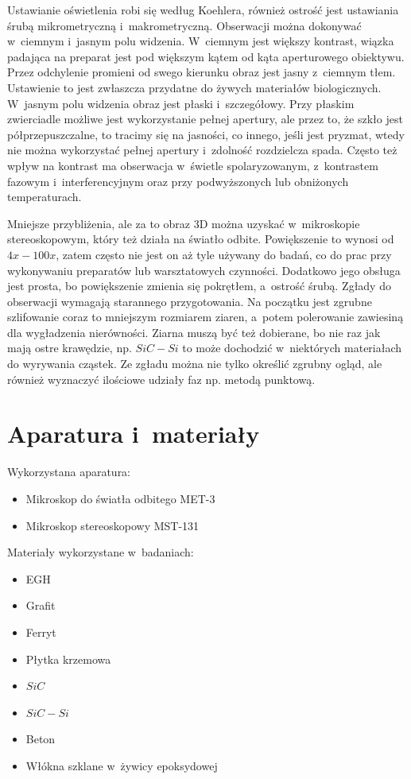 Ustawianie oświetlenia robi się według Koehlera, również ostrość jest ustawiania śrubą mikrometryczną i~makrometryczną. Obserwacji można dokonywać w~ciemnym i~jasnym polu widzenia. W~ciemnym jest większy kontrast, wiązka padająca na preparat jest pod większym kątem od kąta aperturowego obiektywu. Przez odchylenie promieni od swego kierunku obraz jest jasny z~ciemnym tłem. Ustawienie to jest zwłaszcza przydatne do żywych materiałów biologicznych. W~jasnym polu widzenia obraz jest płaski i~szczegółowy. Przy płaskim zwierciadle możliwe jest wykorzystanie pełnej apertury, ale przez to, że szkło jest półprzepuszczalne, to tracimy się na jasności, co innego, jeśli jest pryzmat, wtedy nie można wykorzystać pełnej apertury i~zdolność rozdzielcza spada. Często też wpływ na kontrast ma obserwacja w~świetle spolaryzowanym, z~kontrastem fazowym i~interferencyjnym oraz przy podwyższonych lub obniżonych temperaturach. 

Mniejsze przybliżenia, ale za to obraz 3D można uzyskać w~mikroskopie stereoskopowym, który też działa na światło odbite. Powiększenie to wynosi od $4x-100x$, zatem często nie jest on aż tyle używany do badań, co do prac przy wykonywaniu preparatów lub warsztatowych czynności. Dodatkowo jego obsługa jest prosta, bo powiększenie zmienia się pokrętłem, a~ostrość śrubą. Zgłady do obserwacji wymagają starannego przygotowania. Na początku jest zgrubne szlifowanie coraz to mniejszym rozmiarem ziaren, a~potem polerowanie zawiesiną dla wygładzenia nierówności. Ziarna muszą być też dobierane, bo nie raz jak mają ostre krawędzie, np. $SiC-Si$ to może dochodzić w~niektórych materiałach do wyrywania cząstek. Ze zgładu można nie tylko określić zgrubny ogląd, ale również wyznaczyć ilościowe udziały faz np. metodą punktową.

\section{Aparatura i~materiały}

Wykorzystana aparatura:
\begin{itemize}
    \item Mikroskop do światła odbitego MET-3
    \item Mikroskop stereoskopowy MST-131
\end{itemize}
\newpage
Materiały wykorzystane w~badaniach:
\begin{itemize}
    \item EGH
    \item Grafit
    \item Ferryt
    \item Płytka krzemowa
    \item $SiC$
    \item $SiC-Si$
    \item Beton
    \item Włókna szklane w~żywicy epoksydowej
\end{itemize}


